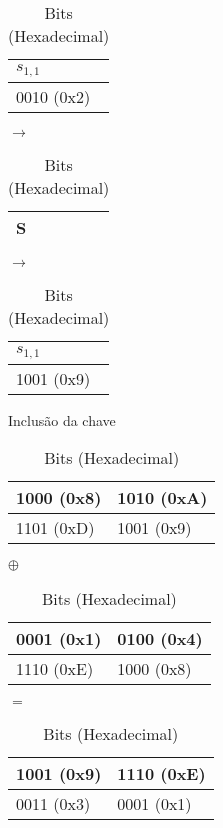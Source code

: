 \documentclass[
    article,            %
    11pt,               %
    oneside,            %
    a4paper,            %
    english,            %
    brazil,             %
    sumario=tradicional,
    ]{abntex2}
\begin{document}
\begin{table}[H]
\vspace{0.5cm}

\begin{tabular}{|l|}
\hline
$s_{1,1}$  \\ \hline
0010 (0x2)       \\ \hline
\end{tabular}
$\longrightarrow$
\begin{tabular}{|l|}
\hline
S  \\ \hline
\end{tabular}
$\longrightarrow$
\begin{tabular}{|l|}
\hline
$s_{1,1}$  \\ \hline
1001 (0x9)      \\ \hline
\end{tabular}

\caption*{Bits (Hexadecimal)}
\end{table}


\label{subsubsub:include-key-round1-dec}

\begin{table}[H]
\centering
\caption{Inclusão da chave}
\label{table-key_include-round1-dec}
\begin{tabular}{|l|l|}
\hline
1000 (0x8) & 1010 (0xA)\\ \hline
1101 (0xD) & 1001 (0x9)\\ \hline
\end{tabular}
$\oplus$
\begin{tabular}{|l|l|}
\hline
0001 (0x1) & 0100 (0x4) \\ \hline
1110 (0xE) & 1000 (0x8) \\ \hline
\end{tabular}
$=$
\begin{tabular}{|l|l|}
\hline
1001 (0x9) & 1110 (0xE) \\ \hline
0011 (0x3) & 0001 (0x1) \\ \hline
\end{tabular}
\caption*{Bits (Hexadecimal)}
\end{table}

\label{subsubsub:misturar-coluna-round1-dec}
\end{document}
